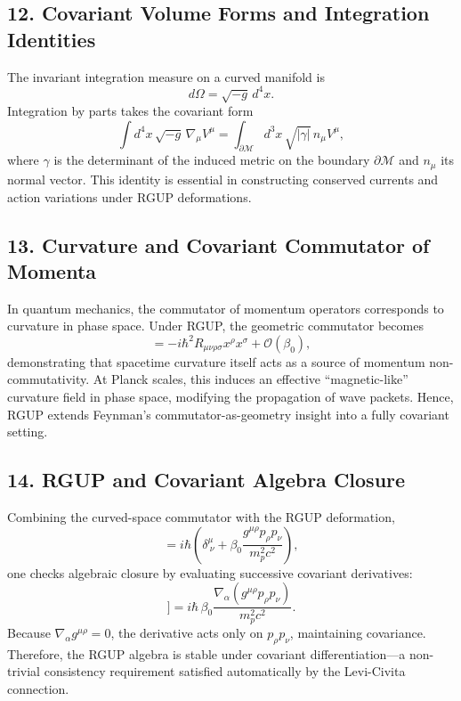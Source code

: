 \documentclass[11pt,oneside]{book}
\numberwithin{equation}{chapter}
\newcommand{\betaz}{\beta_0}
\begin{document}
\subsection*{12. Covariant Volume Forms and Integration Identities}

The invariant integration measure on a curved manifold is
\begin{equation}
d\Omega = \sqrt{-g}\,d^4x.
\end{equation}
Integration by parts takes the covariant form
\begin{equation}
\int d^4x\,\sqrt{-g}\,\nabla_\mu V^\mu
= \int_{\partial\mathcal{M}} d^3x\,\sqrt{|\gamma|}\,n_\mu V^\mu,
\end{equation}
where $\gamma$ is the determinant of the induced metric on the boundary $\partial\mathcal{M}$ and $n_\mu$ its normal vector.  
This identity is essential in constructing conserved currents and action variations under RGUP deformations.

\subsection*{13. Curvature and Covariant Commutator of Momenta}

In quantum mechanics, the commutator of momentum operators corresponds to curvature in phase space.  
Under RGUP, the geometric commutator becomes
\begin{equation}
[p_\mu,p_\nu]
= -i\hbar^2 R_{\mu\nu\rho\sigma}x^\rho x^\sigma
+ \mathcal{O}(\betaz),
\end{equation}
demonstrating that spacetime curvature itself acts as a source of momentum non-commutativity.  
At Planck scales, this induces an effective “magnetic-like” curvature field in phase space, modifying the propagation of wave packets.  
Hence, RGUP extends Feynman’s commutator-as-geometry insight into a fully covariant setting.

\subsection*{14. RGUP and Covariant Algebra Closure}

Combining the curved-space commutator with the RGUP deformation,
\begin{equation}
[x^\mu,p_\nu]
= i\hbar\left(\delta^\mu_{\ \nu}
+ \betaz\frac{g^{\mu\rho}p_\rho p_\nu}{m_p^2 c^2}\right),
\end{equation}
one checks algebraic closure by evaluating successive covariant derivatives:
\begin{equation}
[\nabla_\alpha,[x^\mu,p_\nu]]
= i\hbar\,\betaz\frac{\nabla_\alpha(g^{\mu\rho}p_\rho p_\nu)}{m_p^2 c^2}.
\end{equation}
Because $\nabla_\alpha g^{\mu\rho}=0$, the derivative acts only on $p_\rho p_\nu$, maintaining covariance.  
Therefore, the RGUP algebra is stable under covariant differentiation—a non-trivial consistency requirement satisfied automatically by the Levi-Civita connection.
\end{document}
